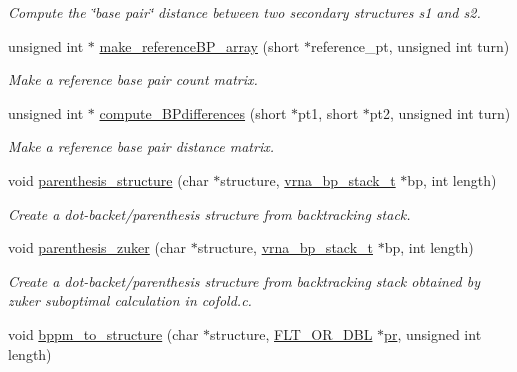 \begin{DoxyCompactItemize}
\begin{DoxyCompactList}\small\item\em Compute the \char`\"{}base pair\char`\"{} distance between two secondary structures s1 and s2. \end{DoxyCompactList}\item 
unsigned int $\ast$ \mbox{\hyperlink{group__struct__utils__deprecated_ga578cd9712dee812fb1c58aa3cc489864}{make\+\_\+reference\+B\+P\+\_\+array}} (short $\ast$reference\+\_\+pt, unsigned int turn)
\begin{DoxyCompactList}\small\item\em Make a reference base pair count matrix. \end{DoxyCompactList}\item 
unsigned int $\ast$ \mbox{\hyperlink{group__struct__utils__deprecated_gadd463184355d0803b6ee6e09f29182f2}{compute\+\_\+\+B\+Pdifferences}} (short $\ast$pt1, short $\ast$pt2, unsigned int turn)
\begin{DoxyCompactList}\small\item\em Make a reference base pair distance matrix. \end{DoxyCompactList}\item 
void \mbox{\hyperlink{group__struct__utils__deprecated_gadf0ad2d46c9ca7b850437d1b79627a7e}{parenthesis\+\_\+structure}} (char $\ast$structure, \mbox{\hyperlink{group__data__structures_gaa651bda42e7692f08cb603cd6834b0ee}{vrna\+\_\+bp\+\_\+stack\+\_\+t}} $\ast$bp, int length)
\begin{DoxyCompactList}\small\item\em Create a dot-\/backet/parenthesis structure from backtracking stack. \end{DoxyCompactList}\item 
void \mbox{\hyperlink{group__struct__utils__deprecated_gab9c5c8311bd5120900585d4fa50c2df0}{parenthesis\+\_\+zuker}} (char $\ast$structure, \mbox{\hyperlink{group__data__structures_gaa651bda42e7692f08cb603cd6834b0ee}{vrna\+\_\+bp\+\_\+stack\+\_\+t}} $\ast$bp, int length)
\begin{DoxyCompactList}\small\item\em Create a dot-\/backet/parenthesis structure from backtracking stack obtained by zuker suboptimal calculation in cofold.\+c. \end{DoxyCompactList}\item 
void \mbox{\hyperlink{group__struct__utils__deprecated_ga129d81c4a1ead793c5b2311333e03dfa}{bppm\+\_\+to\+\_\+structure}} (char $\ast$structure, \mbox{\hyperlink{group__data__structures_ga31125aeace516926bf7f251f759b6126}{F\+L\+T\+\_\+\+O\+R\+\_\+\+D\+BL}} $\ast$\mbox{\hyperlink{fold__vars_8h_ac98ec419070aee6831b44e5c700f090f}{pr}}, unsigned int length)

\end{DoxyCompactItemize}
